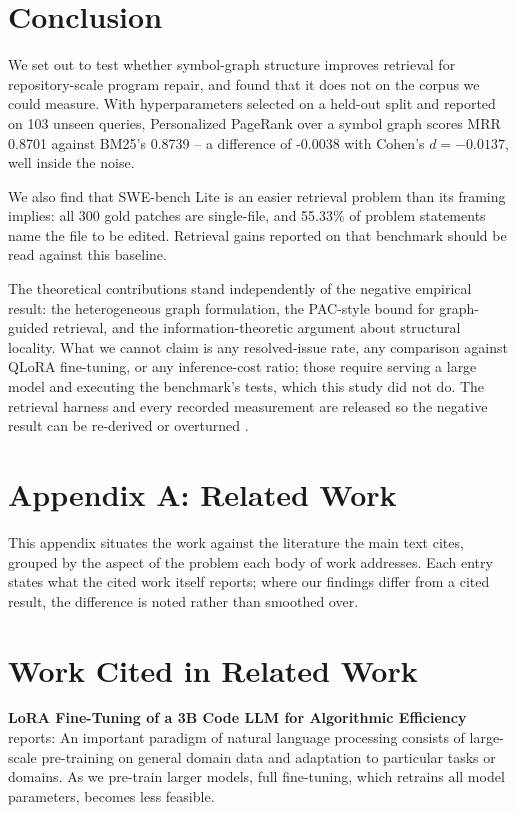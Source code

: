 \documentclass[10pt,twocolumn,letterpaper]{article}
\begin{document}
\section{Conclusion}


We set out to test whether symbol-graph structure improves retrieval for repository-scale program repair, and found that it does not on the corpus we could measure. With hyperparameters selected on a held-out split and reported on 103 unseen queries, Personalized PageRank over a symbol graph scores MRR 0.8701 against BM25's 0.8739 -- a difference of -0.0038 with Cohen's $d = -0.0137$, well inside the noise.

We also find that SWE-bench Lite is an easier retrieval problem than its framing implies: all 300 gold patches are single-file, and 55.33\% of problem statements name the file to be edited. Retrieval gains reported on that benchmark should be read against this baseline.

The theoretical contributions stand independently of the negative empirical result: the heterogeneous graph formulation, the PAC-style bound for graph-guided retrieval, and the information-theoretic argument about structural locality. What we cannot claim is any resolved-issue rate, any comparison against QLoRA fine-tuning, or any inference-cost ratio; those require serving a large model and executing the benchmark's tests, which this study did not do. The retrieval harness and every recorded measurement are released so the negative result can be re-derived or overturned \cite{arxiv_2406_00584,crossref_10_1201_9788743808145_14}.





\section{Appendix A: Related Work}


This appendix situates the work against the literature the main text cites, grouped by the aspect of the problem each body of work addresses. Each entry states what the cited work itself reports; where our findings differ from a cited result, the difference is noted rather than smoothed over.


\section{Work Cited in Related Work}


\textbf{LoRA Fine-Tuning of a 3B Code LLM for Algorithmic Efficiency} \cite{crossref_10_48550_arxiv_2106_09685} reports: An important paradigm of natural language processing consists of large-scale pre-training on general domain data and adaptation to particular tasks or domains. As we pre-train larger models, full fine-tuning, which retrains all model parameters, becomes less feasible.
\end{document}
